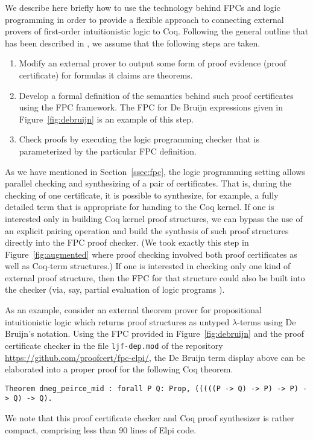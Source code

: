We describe here briefly how to use the technology behind FPCs and
logic programming in order to provide a flexible approach to
connecting external provers of first-order intuitionistic logic to
Coq.  Following the general outline that has been described in
\cite{blanco17cade,blanco20coq}, we assume that the following steps are
taken.
\begin{enumerate}
\item Modify an external prover to output some form of proof evidence
  (proof certificate) for formulas it claims are theorems.

\item Develop a formal definition of the semantics behind such proof
  certificates using the FPC framework.  The FPC for De Bruijn
  expressions given in Figure~\ref{fig:debruijn} is an example of this
  step.

\item Check proofs by executing the logic programming checker that is
  parameterized by the particular FPC definition.
\end{enumerate}
As we have mentioned in Section~\ref{ssec:fpc}, the logic programming
setting allows parallel checking and synthesizing of a pair of
certificates.  That is, during the checking of one certificate, it is
possible to synthesize, for example, a fully detailed term that is
appropriate for handing to the Coq kernel.
If one is interested only in building Coq kernel proof structures, we
can bypass the use of an explicit pairing operation and build the
synthesis of such proof structures directly into the FPC proof
checker.  (We took exactly this step in Figure~\ref{fig:augmented}
where proof checking involved both proof certificates as well as
Coq-term structures.)  If one is interested in checking only one kind
of external proof structure, then the FPC for that structure could
also be built into the checker (via, say, partial evaluation of logic
programs \cite{lloyd91jlp}).

As an example, consider an external theorem prover for propositional
intuitionistic logic which returns proof structures as untyped
$\lambda$-terms using De Bruijn's notation.   Using the FPC provided
in Figure~\ref{fig:debruijn} and the proof certificate checker in the
file \verb+ljf-dep.mod+ of the repository
\url{https://github.com/proofcert/fpc-elpi/},  the De Bruijn term
display above can be elaborated into a proper proof for the following
Coq theorem. 

\begin{lstlisting}[basicstyle=\ttfamily,language=lprolog]
Theorem dneg_peirce_mid : forall P Q: Prop, (((((P -> Q) -> P) -> P) -> Q) -> Q).
\end{lstlisting}

We note that this proof certificate checker and Coq proof synthesizer
is rather compact, comprising less than 90 lines of Elpi code.


